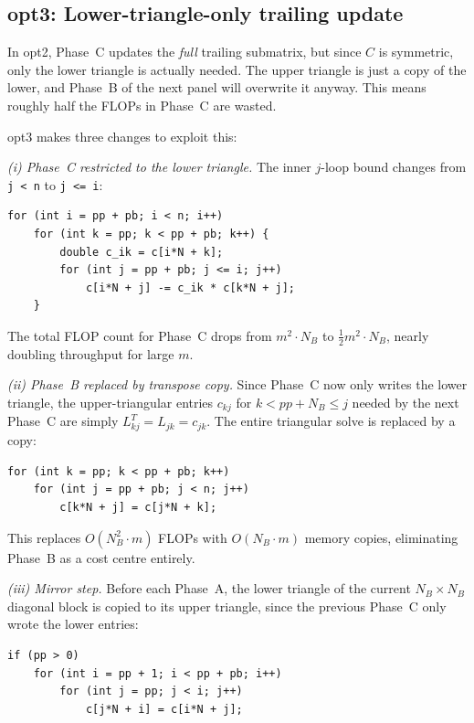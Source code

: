 \documentclass[10pt,leqno]{amsart}
\begin{document}
\subsection{opt3: Lower-triangle-only trailing update}

In opt2, Phase~C updates the \emph{full} trailing submatrix, but since $C$
is symmetric, only the lower triangle is actually needed. The upper triangle
is just a copy of the lower, and Phase~B of the next panel will overwrite it
anyway. This means roughly half the FLOPs in Phase~C are wasted.
 
opt3 makes three changes to exploit this:
 
\textit{(i) Phase~C restricted to the lower triangle.} The inner $j$-loop bound changes from \texttt{j < n} to \texttt{j <= i}:
 
\begin{lstlisting}
for (int i = pp + pb; i < n; i++)
    for (int k = pp; k < pp + pb; k++) {
        double c_ik = c[i*N + k];
        for (int j = pp + pb; j <= i; j++)
            c[i*N + j] -= c_ik * c[k*N + j];
    }
\end{lstlisting}
 
The total FLOP count for Phase~C drops from $m^2 \cdot N_B$ to $\tfrac{1}{2}m^2 \cdot N_B$, nearly doubling throughput for large $m$.
 
\textit{(ii) Phase~B replaced by transpose copy.} Since Phase~C now only writes the lower triangle, the upper-triangular entries $c_{kj}$ for $k < pp + N_B \leq j$ needed by the next Phase~C are simply $L^T_{kj} = L_{jk} = c_{jk}$. The entire triangular solve is replaced by a copy:
 
\begin{lstlisting}
for (int k = pp; k < pp + pb; k++)
    for (int j = pp + pb; j < n; j++)
        c[k*N + j] = c[j*N + k];
\end{lstlisting}
 
This replaces $O(N_B^2 \cdot m)$ FLOPs with $O(N_B \cdot m)$ memory copies, eliminating Phase~B as a cost centre entirely.
 
\textit{(iii) Mirror step.} Before each Phase~A, the lower triangle of the current $N_B \times N_B$ diagonal block is copied to its upper triangle, since the previous Phase~C only wrote the lower entries:
 
\begin{lstlisting}
if (pp > 0)
    for (int i = pp + 1; i < pp + pb; i++)
        for (int j = pp; j < i; j++)
            c[j*N + i] = c[i*N + j];
\end{lstlisting}
 
\end{document}
